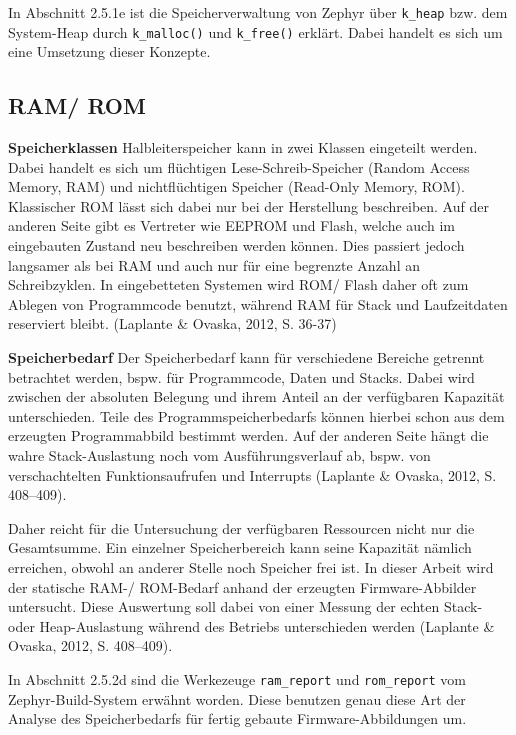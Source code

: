 In Abschnitt 2.5.1e ist die Speicherverwaltung von Zephyr {\"u}ber \lstinline[style=codeinline]|k_heap| bzw. dem System-Heap durch \lstinline[style=codeinline]|k_malloc()| und \lstinline[style=codeinline]|k_free()| erkl{\"a}rt. Dabei handelt es sich um eine Umsetzung dieser Konzepte.

\subsection{RAM/ ROM}
\textbf{Speicherklassen }Halbleiterspeicher kann in zwei Klassen eingeteilt werden. Dabei handelt es sich um fl{\"u}chtigen Lese-Schreib-Speicher (Random Access Memory, RAM) und nichtfl{\"u}chtigen Speicher (Read-Only Memory, ROM). Klassischer ROM l{\"a}sst sich dabei nur bei der Herstellung beschreiben. Auf der anderen Seite gibt es Vertreter wie EEPROM und Flash, welche auch im eingebauten Zustand neu beschreiben werden k{\"o}nnen. Dies passiert jedoch langsamer als bei RAM und auch nur f{\"u}r eine begrenzte Anzahl an Schreibzyklen. In eingebetteten Systemen wird ROM/ Flash daher oft zum Ablegen von Programmcode benutzt, w{\"a}hrend RAM f{\"u}r Stack und Laufzeitdaten reserviert bleibt. (Laplante \& Ovaska, 2012, S. 36-37)

\textbf{Speicherbedarf }Der Speicherbedarf kann f{\"u}r verschiedene Bereiche getrennt betrachtet werden, bspw. f{\"u}r Programmcode, Daten und Stacks. Dabei wird zwischen der absoluten Belegung und ihrem Anteil an der verf{\"u}gbaren Kapazit{\"a}t unterschieden. Teile des Programmspeicherbedarfs k{\"o}nnen hierbei schon aus dem erzeugten Programmabbild bestimmt werden. Auf der anderen Seite h{\"a}ngt die wahre Stack-Auslastung noch vom Ausf{\"u}hrungsverlauf ab, bspw. von verschachtelten Funktionsaufrufen und Interrupts (Laplante \& Ovaska, 2012, S. 408--409).

Daher reicht f{\"u}r die Untersuchung der verf{\"u}gbaren Ressourcen nicht nur die Gesamtsumme. Ein einzelner Speicherbereich kann seine Kapazit{\"a}t n{\"a}mlich erreichen, obwohl an anderer Stelle noch Speicher frei ist. In dieser Arbeit wird der statische RAM-/ ROM-Bedarf anhand der erzeugten Firmware-Abbilder untersucht. Diese Auswertung soll dabei von einer Messung der echten Stack- oder Heap-Auslastung w{\"a}hrend des Betriebs unterschieden werden (Laplante \& Ovaska, 2012, S. 408--409).

In Abschnitt 2.5.2d sind die Werkezeuge \lstinline[style=codeinline]|ram_report| und \lstinline[style=codeinline]|rom_report| vom Zephyr-Build-System erw{\"a}hnt worden. Diese benutzen genau diese Art der Analyse des Speicherbedarfs f{\"u}r fertig gebaute Firmware-Abbildungen um.

